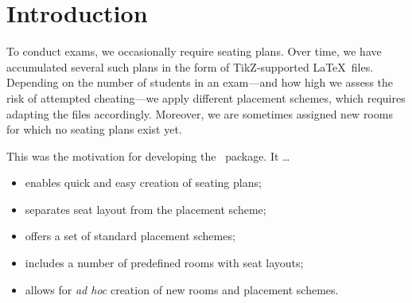 \documentclass[
babel-options={english},
load-preamble-,
title=compact
]{cnltx-doc}
\providecommand{\packagename}{tucseating}
\def\thepkg{\pkg*{\packagename}}
\begin{document}
\section{Introduction}
To conduct exams, we occasionally require seating plans.
Over time, we have accumulated several such plans in the form of TikZ-supported
\LaTeX\ files.
Depending on the number of students in an exam—and how high we assess the
risk of attempted cheating—we apply different placement schemes, which
requires adapting the files accordingly.
Moreover, we are sometimes assigned new rooms for which no seating plans exist yet.

This was the motivation for developing the \thepkg\ package. It \ldots
\begin{itemize}
  \item enables quick and easy creation of seating plans;
  \item separates seat layout from the placement scheme;
  \item offers a set of standard placement schemes;
  \item includes a number of predefined rooms with seat layouts;
  \item allows for \emph{ad hoc} creation of new rooms and placement schemes.
\end{itemize}

\end{document}
